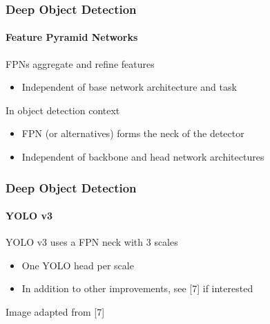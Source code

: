 \documentclass[xetex,professionalfont]{beamer}
\renewcommand\emph[1]{\textcolor{tuwcvl_cvl_blue}{#1}}
\begin{document}
\begin{frame}
	\frametitle{Deep Object Detection}
	\framesubtitle{Feature Pyramid Networks}

	FPNs aggregate and refine features
	\begin{itemize}
		\item Independent of base network architecture and task
	\end{itemize}

	\bigskip

	In object detection context
	\begin{itemize}
		\item FPN (or alternatives) forms the \emph{neck} of the detector
		\item Independent of backbone and head network architectures
	\end{itemize}

\end{frame}


\begin{frame}
	\frametitle{Deep Object Detection}
	\framesubtitle{YOLO v3}

	YOLO v3 uses a FPN neck with 3 scales
	\begin{itemize}
		\item One YOLO head per scale
		\item In addition to other improvements, see [7] if interested
	\end{itemize}

	\bigskip

	\begin{center}
		{\centering Image adapted from [7]}
	\end{center}

\end{frame}
\end{document}
